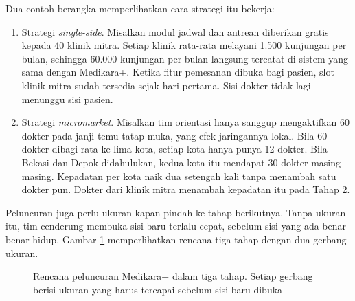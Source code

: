 Dua contoh berangka memperlihatkan cara strategi itu bekerja:
\begin{enumerate}
  \item Strategi \textit{single-side}. Misalkan modul jadwal dan antrean
        diberikan gratis kepada 40 klinik mitra. Setiap klinik rata-rata
        melayani 1.500 kunjungan per bulan, sehingga 60.000 kunjungan per bulan
        langsung tercatat di sistem yang sama dengan Medikara+. Ketika fitur
        pemesanan dibuka bagi pasien, slot klinik mitra sudah tersedia sejak
        hari pertama. Sisi dokter tidak lagi menunggu sisi pasien.
  \item Strategi \textit{micromarket}. Misalkan tim orientasi hanya sanggup
        mengaktifkan 60 dokter pada janji temu tatap muka, yang efek jaringannya
        lokal. Bila 60 dokter dibagi rata ke lima kota, setiap kota hanya punya
        12 dokter. Bila Bekasi dan Depok didahulukan, kedua kota itu mendapat 30
        dokter masing-masing. Kepadatan per kota naik dua setengah kali tanpa
        menambah satu dokter pun. Dokter dari klinik mitra menambah kepadatan
        itu pada Tahap 2.
\end{enumerate}

Peluncuran juga perlu ukuran kapan pindah ke tahap berikutnya. Tanpa ukuran itu,
tim cenderung membuka sisi baru terlalu cepat, sebelum sisi yang ada benar-benar
hidup. Gambar \ref{fig:ch02-tahap-peluncuran} memperlihatkan rencana tiga tahap
dengan dua gerbang ukuran.

\begin{figure}[!htb]
  \centering
  
  \caption{Rencana peluncuran Medikara+ dalam tiga tahap. Setiap gerbang berisi
           ukuran yang harus tercapai sebelum sisi baru dibuka}
  \label{fig:ch02-tahap-peluncuran}
\end{figure}

